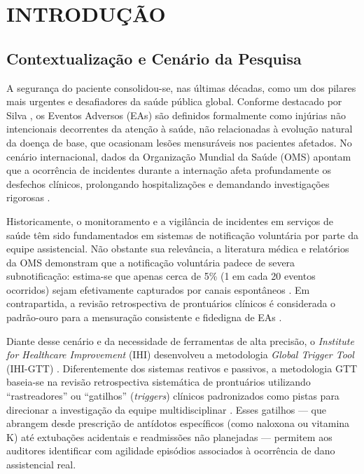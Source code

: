 \chapter{INTRODUÇÃO}
\label{cap:introducao}

\section{Contextualização e Cenário da Pesquisa}
\label{sec:contextualizacao}

A segurança do paciente consolidou-se, nas últimas décadas, como um dos pilares mais urgentes e desafiadores da saúde pública global. Conforme destacado por Silva \cite{silva2022}, os Eventos Adversos (EAs) são definidos formalmente como injúrias não intencionais decorrentes da atenção à saúde, não relacionadas à evolução natural da doença de base, que ocasionam lesões mensuráveis nos pacientes afetados. No cenário internacional, dados da Organização Mundial da Saúde (OMS) apontam que a ocorrência de incidentes durante a internação afeta profundamente os desfechos clínicos, prolongando hospitalizações e demandando investigações rigorosas \cite{oms2020}.

Historicamente, o monitoramento e a vigilância de incidentes em serviços de saúde têm sido fundamentados em sistemas de notificação voluntária por parte da equipe assistencial. Não obstante sua relevância, a literatura médica e relatórios da OMS demonstram que a notificação voluntária padece de severa subnotificação: estima-se que apenas cerca de 5\% (1 em cada 20 eventos ocorridos) sejam efetivamente capturados por canais espontâneos \cite{oms2020}. Em contrapartida, a revisão retrospectiva de prontuários clínicos é considerada o padrão-ouro para a mensuração consistente e fidedigna de EAs \cite{oms2020, classen2011}.

Diante desse cenário e da necessidade de ferramentas de alta precisão, o \textit{Institute for Healthcare Improvement} (IHI) desenvolveu a metodologia \textit{Global Trigger Tool} (IHI-GTT) \cite{griffin2019ihi}. Diferentemente dos sistemas reativos e passivos, a metodologia GTT baseia-se na revisão retrospectiva sistemática de prontuários utilizando ``rastreadores'' ou ``gatilhos'' (\textit{triggers}) clínicos padronizados como pistas para direcionar a investigação da equipe multidisciplinar \cite{griffin2019ihi, classen2011}. Esses gatilhos — que abrangem desde prescrição de antídotos específicos (como naloxona ou vitamina K) até extubações acidentais e readmissões não planejadas — permitem aos auditores identificar com agilidade episódios associados à ocorrência de dano assistencial real.

